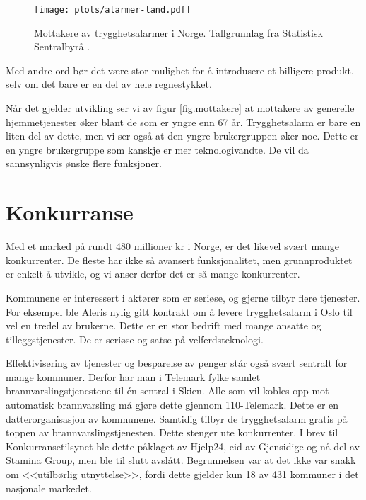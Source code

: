 \begin{figure}
  \texttt{[image: plots/alarmer-land.pdf]}
  \caption{Mottakere av trygghetsalarmer i Norge.
    Tallgrunnlag fra Statistisk Sentralbyrå \cite{iplos.2013}.}
  \label{fig.mottakere}
\end{figure}

Med andre ord bør det være stor mulighet for å introdusere et billigere
produkt, selv om det bare er en del av hele regnestykket.

Når det gjelder utvikling ser vi av figur \vref{fig.mottakere} at mottakere av
generelle hjemmetjenester øker blant de som er yngre enn 67 år. Trygghetsalarm
er bare en liten del av dette, men vi ser også at den yngre brukergruppen øker
noe. Dette er en yngre brukergruppe som kanskje er mer teknologivandte. De vil
da sannsynligvis ønske flere funksjoner.




\section{Konkurranse}

Med et marked på rundt 480 millioner kr i Norge, er det likevel svært mange
konkurrenter. De fleste har ikke så avansert funksjonalitet, men grunnproduktet
er enkelt å utvikle, og vi anser derfor det er så mange konkurrenter.

Kommunene er interessert i aktører som er seriøse, og gjerne tilbyr flere
tjenester. For eksempel ble Aleris nylig gitt kontrakt om å levere
trygghetsalarm i Oslo \cite{telenor.aleris} til vel en tredel av brukerne.
Dette er en stor bedrift med mange ansatte og tilleggstjenester. De er seriøse
og satse på velferdsteknologi.

Effektivisering av tjenester og besparelse av penger står også svært sentralt
for mange kommuner. Derfor har man i Telemark fylke samlet
brannvarslingstjenestene til én sentral i Skien. Alle som vil kobles opp mot
automatisk brannvarsling må gjøre dette gjennom 110-Telemark. Dette er en
datterorganisasjon av kommunene. Samtidig tilbyr de trygghetsalarm gratis på
toppen av brannvarslingstjenesten. Dette stenger ute konkurrenter. I brev til
Konkurransetilsynet \cite{telemark.konkurransetilsyn} ble dette påklaget av
Hjelp24, eid av Gjensidige og nå del av Stamina Group, men ble til slutt
avslått. Begrunnelsen var at det ikke var snakk om <<utilbørlig utnyttelse>>,
fordi dette gjelder kun 18 av 431 kommuner i det nasjonale markedet.

